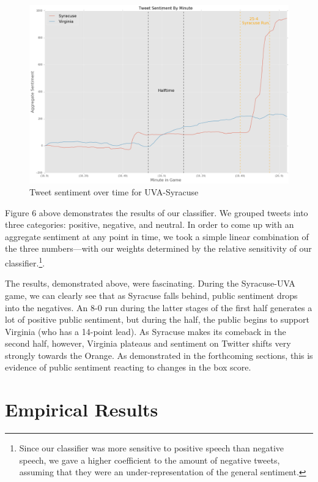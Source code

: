 \documentclass[12pt]{article}
\begin{document}
\begin{doublespacing}
\begin{figure} [H]
	\centering
	\includegraphics[scale = 0.4] {Images/Cuse_UVA_TweetSentiment.png} 
	\caption{Tweet sentiment over time for UVA-Syracuse}
\end{figure}

Figure 6 above demonstrates the results of our classifier. We grouped tweets into three categories: positive, negative, and neutral. In order to come up with an aggregate sentiment at any point in time, we took a simple linear combination of the three numbers---with our weights determined by the relative sensitivity of our classifier.\footnote{Since our classifier was more sensitive to positive speech than negative speech, we gave a higher coefficient to the amount of negative tweets, assuming that they were an under-representation of the general sentiment.}. 

The results, demonstrated above, were fascinating. During the Syracuse-UVA game, we can clearly see that as Syracuse falls behind, public sentiment drops into the negatives. An 8-0 run during the latter stages of the first half generates a lot of positive public sentiment, but during the half, the public begins to support Virginia (who has a 14-point lead). As Syracuse makes its comeback in the second half, however, Virginia plateaus and sentiment on Twitter shifts very strongly towards the Orange. As demonstrated in the forthcoming sections, this is evidence of public sentiment reacting to changes in the box score. 

\section{Empirical Results}


\end{doublespacing}
\end{document}
